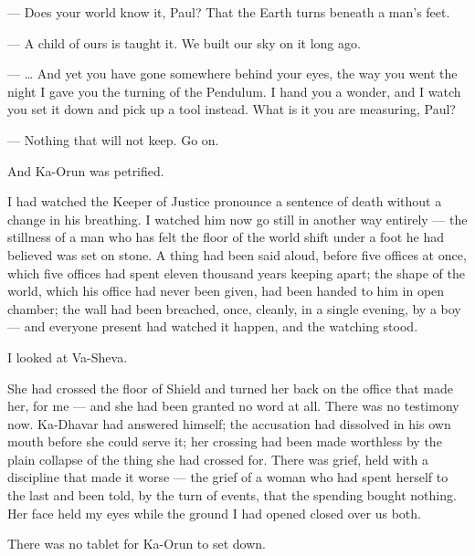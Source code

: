 \ornament
 
\begin{room}

--- Does your world know it, Paul? That the Earth turns beneath a man's feet.

--- A child of ours is taught it. We built our sky on it long ago.

--- \ldots{} And yet you have gone somewhere behind your eyes, the way you went the night I gave you the turning of the Pendulum. I hand you a wonder, and I watch you set it down and pick up a tool instead. What is it you are measuring, Paul?

--- Nothing that will not keep. Go on.

\end{room}
 
\ornament
 
And Ka-Orun was petrified.\par
 
I had watched the Keeper of Justice pronounce a sentence of death without a change in his breathing. I watched him now go still in another way entirely --- the stillness of a man who has felt the floor of the world shift under a foot he had believed was set on stone. A thing had been said aloud, before five offices at once, which five offices had spent eleven thousand years keeping apart; the shape of the world, which his office had never been given, had been handed to him in open chamber; the wall had been breached, once, cleanly, in a single evening, by a boy --- and everyone present had watched it happen, and the watching stood.\par
 
I looked at Va-Sheva.\par
 
She had crossed the floor of Shield and turned her back on the office that made her, for me --- and she had been granted no word at all. There was no testimony now. Ka-Dhavar had answered himself; the accusation had dissolved in his own mouth before she could serve it; her crossing had been made worthless by the plain collapse of the thing she had crossed for. There was grief, held with a discipline that made it worse --- the grief of a woman who had spent herself to the last and been told, by the turn of events, that the spending bought nothing. Her face held my eyes while the ground I had opened closed over us both.\par
 
\ornament
 
There was no tablet for Ka-Orun to set down.\par
 
